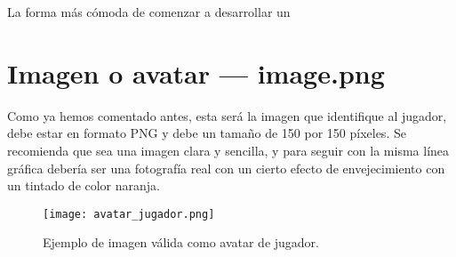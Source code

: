 La forma más cómoda de comenzar a desarrollar un 


\section{Imagen o avatar --- image.png}

Como ya hemos comentado antes, esta será la imagen que identifique al jugador, debe estar en formato PNG y debe un tamaño
de 150 por 150 píxeles. Se recomienda que sea una imagen clara y sencilla, y para seguir con la misma línea gráfica debería
ser una fotografía real con un cierto efecto de envejecimiento con un tintado de color naranja.

\begin{figure}[h]
  \begin{center}
    \texttt{[image: avatar\_jugador.png]}
  \end{center}
  \caption{Ejemplo de imagen válida como avatar de jugador.}
  \label{fig:avatar_jugador}
\end{figure}


